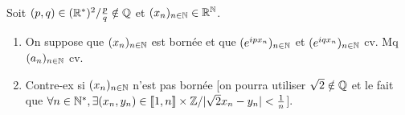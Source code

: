 
\begin{statementbox}
Soit $(p,q) \in (\mathbb R^*)^2 / \frac{p}{q} \notin \mathbb Q$ et $(x_n)_{n \in \mathbb N} \in \mathbb R^\mathbb N$.
\begin{enumerate}[label=\alph*)]
  \item On suppose que $(x_n)_{n \in \mathbb N}$ est bornée et que $(e^{i p x_n})_{n \in \mathbb N}$ et $(e^{i q x_n})_{n \in \mathbb N}$ cv.
  Mq $(a_n)_{n \in \mathbb N}$ cv.
  \item Contre-ex si $(x_n)_{n \in \mathbb N}$ n'est pas bornée [on pourra utiliser $\sqrt{2} \notin \mathbb Q$ et le fait que $\forall n \in \mathbb N^*, \exists (x_n, y_n) \in \llbracket 1, n \rrbracket \times \mathbb Z / |\sqrt{2} x_n - y_n| < \frac{1}{n}$].
\end{enumerate}
\end{statementbox}

